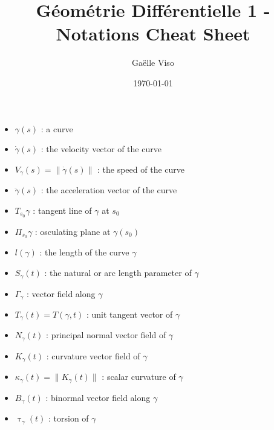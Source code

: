 \documentclass[a4paper,12pt]{article}
\title{Géométrie Différentielle 1 - Notations Cheat Sheet}
\author{Gaëlle Viso}
\date{\today}
\begin{document}
\maketitle
\vspace{10 mm} 

\begin{itemize}

\item $\gamma(s) $ : a curve \\
\item $\dot \gamma(s)$ : the velocity vector of the curve \\
\item $V_\gamma(s) = \|\dot \gamma(s)\|$ : the speed of the curve \\
\item $\ddot \gamma(s)$ : the acceleration vector of the curve \\
\item $T_{s_0}\gamma$ : tangent line of $\gamma$ at $s_0$ \\
\item $\Pi_{s_0}\gamma$ : osculating plane at $\gamma(s_0)$ \\
\item $l(\gamma)$ : the length of the curve $\gamma$ \\
\item $S_\gamma(t)$ : the natural or arc length parameter of $\gamma$ \\
\item $\Gamma_\gamma$ : vector field along $\gamma$ \\
\item $T_\gamma(t) = T(\gamma, t)$ : unit tangent vector of $\gamma$ \\
\item $N_\gamma(t) $ : principal normal vector field of $\gamma$ \\
\item $K_\gamma(t)$ : curvature vector field of $\gamma$ \\
\item $\kappa_\gamma(t) = \|K_\gamma(t)\|$ : scalar curvature of $\gamma$ \\
\item $B_\gamma(t)$ : binormal vector field along $\gamma$ \\
\item $\uptau_\gamma(t)$ : torsion of $\gamma$ \\

\end{itemize}
\end{document}
